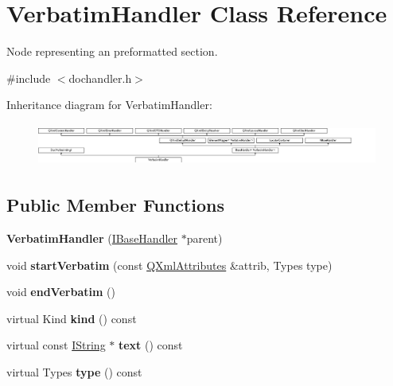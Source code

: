 \hypertarget{class_verbatim_handler}{}\section{Verbatim\+Handler Class Reference}
\label{class_verbatim_handler}


Node representing an preformatted section.  




{\ttfamily \#include $<$dochandler.\+h$>$}

Inheritance diagram for Verbatim\+Handler\+:\begin{figure}[H]
\begin{center}
\leavevmode
\includegraphics[height=1.409692cm]{class_verbatim_handler}
\end{center}
\end{figure}
\subsection*{Public Member Functions}
\begin{DoxyCompactItemize}
\item 
\mbox{\label{class_verbatim_handler_a14b51644821b88fd7a9e0b144969ec4b}} 
{\bfseries Verbatim\+Handler} (\mbox{\hyperlink{class_i_base_handler}{I\+Base\+Handler}} $\ast$parent)
\item 
\mbox{\label{class_verbatim_handler_a3b2a644064db516a90a1cda92a6912fa}} 
void {\bfseries start\+Verbatim} (const \mbox{\hyperlink{class_q_xml_attributes}{Q\+Xml\+Attributes}} \&attrib, Types type)
\item 
\mbox{\label{class_verbatim_handler_a50877539194a3416c096688361cab078}} 
void {\bfseries end\+Verbatim} ()
\item 
\mbox{\label{class_verbatim_handler_aa2d8fde1fd15171da053930397448bc8}} 
virtual Kind {\bfseries kind} () const
\item 
\mbox{\label{class_verbatim_handler_a3d45441e8146992b02b1d925253be3eb}} 
virtual const \mbox{\hyperlink{class_i_string}{I\+String}} $\ast$ {\bfseries text} () const
\item 
\mbox{\label{class_verbatim_handler_a8511a02ac0ca48b8a0a705c1d162f522}} 
virtual Types {\bfseries type} () const
\end{DoxyCompactItemize}

